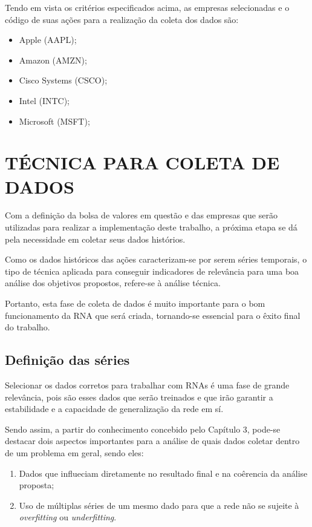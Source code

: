 Tendo em vista os critérios especificados acima, as empresas selecionadas e o código de suas ações para a realização da coleta dos dados são:
\begin{itemize}
	\item Apple (AAPL);
	\item Amazon (AMZN);
	\item Cisco Systems (CSCO);
	\item Intel (INTC);
	\item Microsoft (MSFT);
\end{itemize}

\section{TÉCNICA PARA COLETA DE DADOS}
Com a definição da bolsa de valores em questão e das empresas que serão utilizadas para realizar a implementação deste trabalho, a próxima etapa se dá pela necessidade em coletar seus dados histórios.

Como os dados históricos das ações caracterizam-se por serem séries temporais, o tipo de técnica aplicada para conseguir indicadores de relevância para uma boa análise dos objetivos propostos, refere-se à análise técnica. 

Portanto, esta fase de coleta de dados é muito importante para o bom funcionamento da RNA que será criada, tornando-se essencial para o êxito final do trabalho.

\subsection{Definição das séries}
Selecionar os dados corretos para trabalhar com RNAs é uma fase de grande relevância, pois são esses dados que serão treinados e que irão garantir a estabilidade e a capacidade de generalização da rede em sí.

Sendo assim, a partir do conhecimento concebido pelo Capítulo 3, pode-se destacar dois aspectos importantes para a análise de quais dados coletar dentro de um problema em geral, sendo eles:

\begin{enumerate}
\item Dados que influeciam diretamente no resultado final e na coêrencia da análise proposta;
\item Uso de múltiplas séries de um mesmo dado para que a rede não se sujeite à \textit{overfitting} ou \textit{underfitting}.
\end{enumerate}

